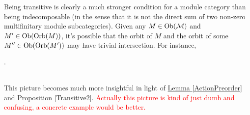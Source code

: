 \noindent Being transitive is clearly a much stronger condition for a module category than being indecomposable (in the sense that it is not the direct sum of two non-zero multifinitary module subcategories). Given any $M \in \textnormal{Ob}(\mathcal{M})$ and $M' \in \textnormal{Ob}(\textup{Orb}(M))$, it's possible that the orbit of $M$ and the orbit of some $M'' \in \textnormal{Ob}(\textup{Orb}(M'))$ may have trivial intersection. For instance,\\[-0.5\linespacing]
\begin{center}
.
\end{center}
\noindent\\ This picture becomes much more insightful in light of \hyperref[ActionPreorder]{Lemma \ref*{ActionPreorder}} and \hyperref[Transitive2]{Proposition \ref*{Transitive2}}. \textcolor{red}{Actually this picture is kind of just dumb and confusing, a concrete example would be better.}\\



